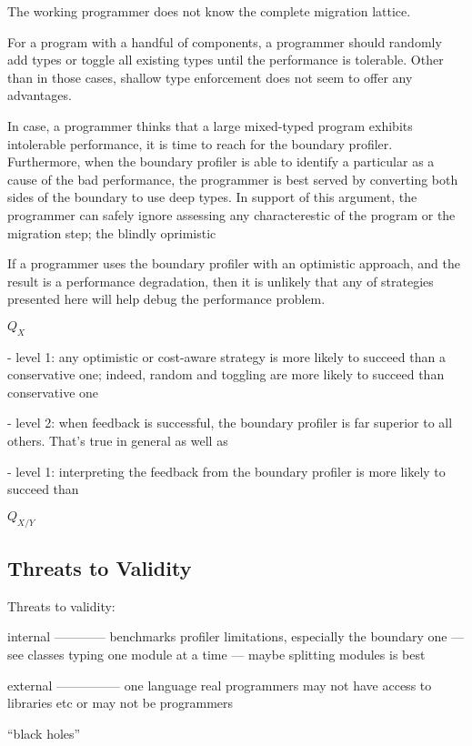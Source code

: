 
The working programmer does not know the complete migration lattice. 

For a program with a handful of components, a programmer should randomly
add types or toggle all existing types until the performance is tolerable.
Other than in those cases, shallow type enforcement does not seem to
offer any advantages. 

In case, a programmer thinks that a large mixed-typed program exhibits
intolerable performance, it is time to reach for the boundary profiler.
Furthermore, when the boundary profiler is able to identify a particular
as a cause of the bad performance, the programmer is best served by
converting both sides of the boundary to use deep types. In support of
this argument, the programmer can safely ignore assessing any
characterestic of the program or the migration step; the blindly oprimistic  

If a programmer uses the boundary profiler with an optimistic approach,
and the result is a performance degradation, then it is unlikely that any
of strategies presented here will help debug the performance problem. 



$Q_X$

- level 1: any optimistic or cost-aware strategy is more likely to
  succeed than a conservative one; indeed, random and toggling are
  more likely to succeed than conservative one

- level 2: when feedback is successful, the boundary profiler
  is far superior to all others. That's true in general as well as 

- level 1: interpreting the feedback from the boundary
  profiler is more likely to succeed than 



$Q_{X/Y}$

\subsection{Threats to Validity}


Threats to validity:

internal
————
benchmarks 
profiler limitations, especially the boundary one — see classes
typing one module at a time — maybe splitting modules is best


external
—————
one language 
real programmers may not have access to libraries etc or may not be programmers 



``black holes''
